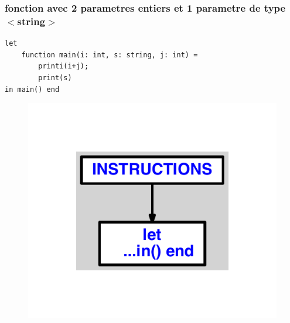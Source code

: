 \documentclass{article}
\begin{document}
\subsubsection{fonction avec 2 parametres entiers et 1 parametre de type $ < $string$ > $}
\begin{lstlisting}
let
	function main(i: int, s: string, j: int) =
		printi(i+j);
		print(s)
in main() end
\end{lstlisting}
\newpage
\begin{figure}[H]
\centering
\includegraphics[max width=\textwidth]{ast/ast_236.pdf}
\end{figure}
\newpage
\end{document}
